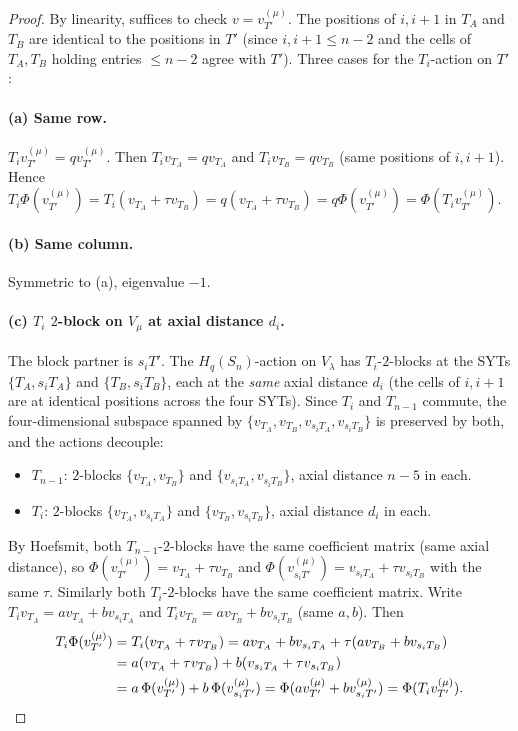 \documentclass[11pt]{article}
\theoremstyle{definition}
\begin{document}
\begin{proof}
By linearity, suffices to check $v=v_{T'}^{(\mu)}$.  The positions of
$i,i{+}1$ in $T_A$ and $T_B$ are identical to the positions in $T'$
(since $i,i{+}1\le n-2$ and the cells of $T_A,T_B$ holding entries
$\le n-2$ agree with $T'$).  Three cases for the $T_i$-action on
$T'$:

\paragraph{(a) Same row.}  $T_iv_{T'}^{(\mu)}=qv_{T'}^{(\mu)}$.  Then
$T_iv_{T_A}=qv_{T_A}$ and $T_iv_{T_B}=qv_{T_B}$ (same positions of
$i,i{+}1$).  Hence $T_i\Phi(v_{T'}^{(\mu)})
=T_i(v_{T_A}+\tau v_{T_B})=q(v_{T_A}+\tau v_{T_B})=q\Phi(v_{T'}^{(\mu)})
=\Phi(T_iv_{T'}^{(\mu)})$.

\paragraph{(b) Same column.}  Symmetric to (a), eigenvalue $-1$.

\paragraph{(c) $T_i$ $2$-block on $V_\mu$ at axial distance $d_i$.}
The block partner is $s_iT'$.  The $H_q(S_n)$-action on $V_\lambda$
has $T_i$-$2$-blocks at the SYTs $\{T_A,s_iT_A\}$ and
$\{T_B,s_iT_B\}$, each at the \emph{same} axial distance $d_i$
(the cells of $i,i+1$ are at identical positions across the four
SYTs).  Since $T_i$ and $T_{n-1}$ commute, the four-dimensional
subspace spanned by $\{v_{T_A},v_{T_B},v_{s_iT_A},v_{s_iT_B}\}$ is
preserved by both, and the actions decouple:
\begin{itemize}[leftmargin=2em,topsep=0.3em,itemsep=0.2em]
\item $T_{n-1}$: $2$-blocks $\{v_{T_A},v_{T_B}\}$ and
$\{v_{s_iT_A},v_{s_iT_B}\}$, axial distance $n-5$ in each.
\item $T_i$: $2$-blocks $\{v_{T_A},v_{s_iT_A}\}$ and
$\{v_{T_B},v_{s_iT_B}\}$, axial distance $d_i$ in each.
\end{itemize}
By Hoefsmit, both $T_{n-1}$-$2$-blocks have the same coefficient
matrix (same axial distance), so $\Phi(v_{T'}^{(\mu)})
=v_{T_A}+\tau v_{T_B}$ and
$\Phi(v_{s_iT'}^{(\mu)})=v_{s_iT_A}+\tau v_{s_iT_B}$ with the
same $\tau$.  Similarly both $T_i$-$2$-blocks have the same
coefficient matrix.  Write
$T_iv_{T_A}=a v_{T_A}+b v_{s_iT_A}$ and
$T_iv_{T_B}=a v_{T_B}+b v_{s_iT_B}$ (same $a,b$).  Then
\begin{align*}
   T_i\Phi(v_{T'}^{(\mu)})
   &= T_i(v_{T_A}+\tau v_{T_B})
   = a v_{T_A}+b v_{s_iT_A}+\tau(av_{T_B}+bv_{s_iT_B}) \\
   &= a(v_{T_A}+\tau v_{T_B})+b(v_{s_iT_A}+\tau v_{s_iT_B}) \\
   &= a\,\Phi(v_{T'}^{(\mu)})+b\,\Phi(v_{s_iT'}^{(\mu)})
   = \Phi(av_{T'}^{(\mu)}+bv_{s_iT'}^{(\mu)})
   = \Phi(T_iv_{T'}^{(\mu)}). \qedhere
\end{align*}
\end{proof}
\end{document}
